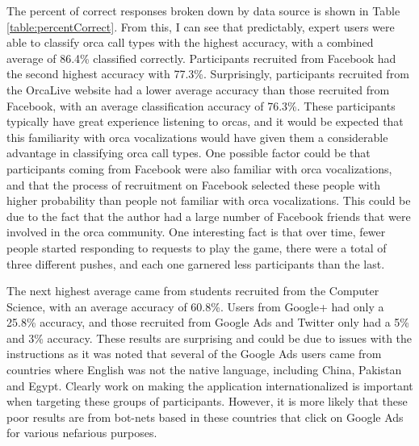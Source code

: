 \documentclass[12pt,oneside]{book}
\begin{document}
The percent of correct responses broken down by data source is shown
in Table \ref{table:percentCorrect}.  From this, I can see that
predictably, expert users were able to classify orca call types with the
highest accuracy, with a combined average of 86.4\% classified
correctly.  Participants recruited from Facebook had the second
highest accuracy with 77.3\%.  Surprisingly, participants recruited
from the OrcaLive website had a lower average accuracy than those
recruited from Facebook, with an average classification accuracy of
76.3\%.  These participants typically have great experience listening
to orcas, and it would be expected that this familiarity with orca
vocalizations would have given them a considerable advantage in
classifying orca call types.  One possible factor could be that
participants coming from Facebook were also familiar with orca
vocalizations, and that the process of recruitment on Facebook
selected these people with higher probability than people not familiar
with orca vocalizations.  This could be due to the fact that the
author had a large number of Facebook friends that were involved in
the orca community.  One interesting fact is that over time, fewer
people started responding to requests to play the game, there were a
total of three different pushes, and each one garnered less
participants than the last.

The next highest average came from students recruited from the
Computer Science, with an average accuracy of 60.8\%.  Users from
Google+ had only a 25.8\% accuracy, and those recruited from Google
Ads and Twitter only had a 5\% and 3\% accuracy.  These results are
surprising and could be due to issues with the instructions as it was
noted that several of the Google Ads users came from countries where
English was not the native language, including China, Pakistan and
Egypt.  Clearly work on making the application internationalized is
important when targeting these groups of participants.  However, it is
more likely that these poor results are from bot-nets based in these
countries that click on Google Ads for various nefarious purposes.
\end{document}
